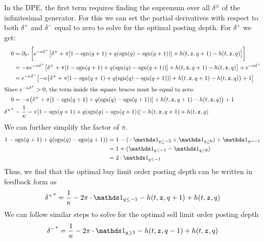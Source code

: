 In the DPE, the first term requires finding the supremum over all $\delta^\pm$ of the infinitesimal generator. For this we can set the partial derivatives with respect to both $\delta^+$ and $\delta^-$ equal to zero to solve for the optimal posting depth. For $\delta^+$ we get:
\begin{align*}
0 & = \partial_{\delta^+} \biggl[ e^{ -\kappa \delta^{+}} \bigl[ \delta^+ + \pi [ 1 - \mathrm{sgn}(q+1) + q(\mathrm{sgn}(q) - \mathrm{sgn}(q+1) ) ] + h(t,\bm{z},q+1) - h(t,\bm{z},q) \bigr] \biggr] \\
& = -\kappa e^{ -\kappa \delta^{+}} \bigl[ \delta^+ + \pi [ 1 - \mathrm{sgn}(q+1) + q(\mathrm{sgn}(q) - \mathrm{sgn}(q+1) ) ] + h(t,\bm{z},q+1) - h(t,\bm{z},q) \bigr] + e^{ -\kappa \delta^{+}} \\
& = e^{ -\kappa \delta^{+}} \bigl[ -\kappa \bigl( \delta^+ + \pi [ 1 - \mathrm{sgn}(q+1) + q(\mathrm{sgn}(q) - \mathrm{sgn}(q+1) ) ] + h(t,\bm{z},q+1) - h(t,\bm{z},q) \bigr) + 1 \bigr] \\
\intertext{Since $e^{ -\kappa \delta^{+}}>0$, the term inside the square braces must be equal to zero:}
0 & = -\kappa \bigl( \delta^+ + \pi [ 1 - \mathrm{sgn}(q+1) + q(\mathrm{sgn}(q) - \mathrm{sgn}(q+1) ) ] + h(t,\bm{z},q+1) - h(t,\bm{z},q) \bigr) + 1 \\
{\delta^+}^* & = \frac{1}{\kappa} - \pi [ 1 - \mathrm{sgn}(q+1) + q(\mathrm{sgn}(q) - \mathrm{sgn}(q+1) ) ] - h(t,\bm{z},q+1) + h(t,\bm{z},q) 
\end{align*}
We can further simplify the factor of $\pi$.
\begin{align*}
1 - \mathrm{sgn}(q+1) + q(\mathrm{sgn}(q) - \mathrm{sgn}(q+1) )  & = 
1 - (- \indicator_{q \leq -2} + \indicator_{q \geq 0}) +  \indicator_{q = -1} \\
& = 1 + ( \indicator_{q \leq -1} -  \indicator_{q \geq 0} )\\
& = 2 \cdot \indicator_{q \leq -1}
\end{align*}
Thus, we find that the optimal buy limit order posting depth can be written in feedback form as
\begin{equation}
\label{eq:optbuydepthfeedback}
{\delta^+}^* = \frac{1}{\kappa} - 2 \pi \cdot \indicator_{q \leq -1} - h(t,\bz,q+1) + h(t,\bz,q) 
\end{equation}
We can follow similar steps to solve for the optimal sell limit order posting depth
\begin{equation}
\label{eq:optselldepthfeedback}
{\delta^-}^* = \frac{1}{\kappa} - 2 \pi \cdot \indicator_{q \geq 1} - h(t,\bz,q-1) + h(t,\bz,q) 
\end{equation}
